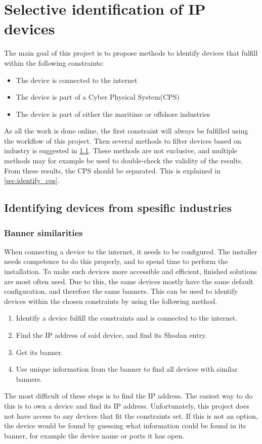 \section{Selective identification of IP devices} \label{sec:method}
The main goal of this project is to propose methods to identify devices that fulfill within the following constraints:
\begin{itemize}
    \item The device is connected to the internet 
    \item The device is part of a Cyber Physical System(CPS)
    \item The device is part of either the maritime or offshore industries
\end{itemize}
As all the work is done online, the first constraint will always be fulfilled using the workflow of this project. 
Then several methods to filter devices based on industry is suggested in \cref{sec:identify_industry}. These methods are not exclusive, and multiple methods may for example be used to double-check the validity of the results.
From these results, the CPS should be separated. This is explained in \cref{sec:identify_cps}.

\subsection{Identifying devices from spesific industries} \label{sec:identify_industry}
\subsubsection{Banner similarities} \label{sec:banner_method}
When connecting a device to the internet, it needs to be configured. The installer needs competence to do this properly, and to spend time to perform the installation. To make such devices more accessible and efficient, finished solutions are most often used. Due to this, the same devices mostly have the same default configuration, and therefore the same banners. This can be used to identify devices within the chosen constraints by using the following method.
\begin{enumerate}
    \item Identify a device fulfill the constraints and is connected to the internet.
    \item Find the IP address of said device, and find its Shodan entry.
    \item Get its banner.
    \item Use unique information from the banner to find all devices with similar banners.
\end{enumerate}
The most difficult of these steps is to find the IP address. The easiest way to do this is to own a device and find its IP address. Unfortunately, this project does not have access to any devices that fit the constraints set.
If this is not an option, the device would be found by guessing what information could be found in its banner, for example the device name or ports it has open.


